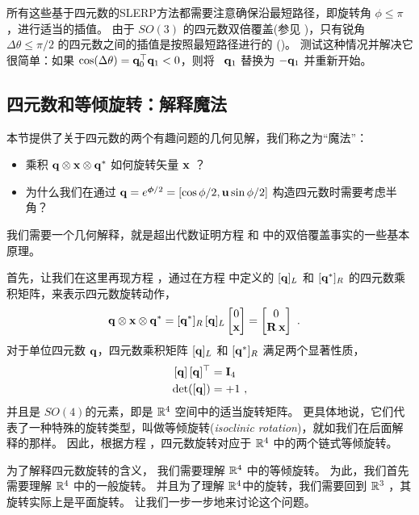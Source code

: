 所有这些基于四元数的SLERP方法都需要注意确保沿最短路径，即旋转角 $\phi\leq\pi$，进行适当的插值。
由于 $SO(3)$ 的四元数双倍覆盖(参见 )，只有锐角 $\Delta\theta\leq\pi/2$ 的四元数之间的插值是按照最短路径进行的 ()。
测试这种情况并解决它很简单：如果 $\cos(\Delta\theta)={\bf q}_0^{\top}{\bf q}_1<0$，则将 \eg~${\bf q}_1$ 替换为 $-{\bf q}_1$ 并重新开始。



\subsection{四元数和等倾旋转：解释魔法}
\label{sec:isoclinic}

本节提供了关于四元数的两个有趣问题的几何见解，我们称之为“魔法”：
\begin{itemize}
\item
乘积 ${\bf q}\otimes{\bf x}\otimes{\bf q}^*$ 如何旋转矢量 ${\bf x}$ ？
\item
为什么我们在通过 ${\bf q}=e^{{\bm \phi}/2}=[\cos \phi/2 , {\bf u}\sin\phi/2]$ 构造四元数时需要考虑半角？
\end{itemize}
%
我们需要一个几何解释，就是超出代数证明方程  和  中的双倍覆盖事实的一些基本原理。

首先，让我们在这里再现方程  ，通过在方程  中定义的 $[{\bf q}]_L$ 和 $[{\bf q}^*]_R$ 的四元数乘积矩阵，来表示四元数旋转动作，
%
\begin{align*}
{\bf q}\otimes
{\bf x}\otimes{\bf q}^*
&= [{\bf q}^*]_R\,[{\bf q}]_L\begin{bmatrix}
0 \\ {\bf x}
\end{bmatrix} 
= \begin{bmatrix}
0 \\ {\bf R}\,{\bf x}
\end{bmatrix} 
~.
\end{align*}
%
对于单位四元数 ${\bf q}$，四元数乘积矩阵 $[{\bf q}]_L$ 和 $[{\bf q}^*]_R$ 满足两个显著性质，
%
%
\begin{align}
 [{\bf q}]\,[{\bf q}]^{\top} &= {\bf I}_4 \\
 \det([{\bf q}]) &= +1 
 ~, 
\end{align}%
%
并且是 $SO(4)$的元素，即是 ${\mathbb R}^4$ 空间中的适当旋转矩阵。 
更具体地说，它们代表了一种特殊的旋转类型，叫做等倾旋转(\emph{isoclinic rotation})，就如我们在后面解释的那样。
因此，根据方程  ，四元数旋转对应于 ${\mathbb R}^4$ 中的两个链式等倾旋转。

为了解释四元数旋转的含义， %
我们需要理解 ${\mathbb R}^4$ 中的等倾旋转。
为此，我们首先需要理解 ${\mathbb R}^4$ 中的一般旋转。
并且为了理解 ${\mathbb R}^4$中的旋转，我们需要回到 ${\mathbb R}^3$ ，其旋转实际上是平面旋转。
让我们一步一步地来讨论这个问题。



